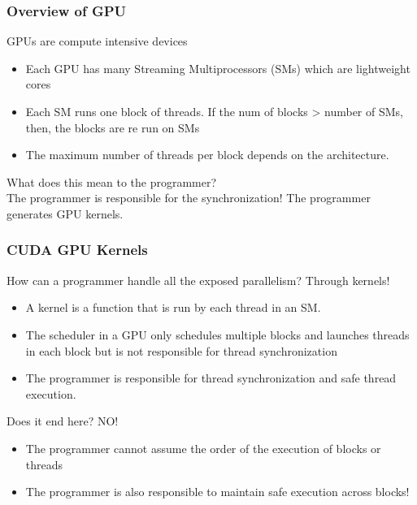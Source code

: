\documentclass[mathserif]{beamer}
\begin{document}
\begin{frame}                                                                                                                                                                          
\frametitle{Overview of GPU}
GPUs are compute intensive devices
\begin{itemize}
\item Each GPU has many Streaming Multiprocessors (SMs) which are lightweight cores  
\item Each SM runs one block of threads. If the num of blocks > number of SMs, then, the blocks are re run on SMs
\item The maximum number of threads per block depends on the architecture.  
\end{itemize}
What does this mean to the programmer? \\
The programmer is responsible for the synchronization!
The programmer generates GPU kernels. 
\end{frame}              

\begin{frame}                                                                                                                                                                          
\frametitle{CUDA GPU Kernels}
How can a programmer handle all the exposed parallelism? Through kernels!
\begin{itemize}
\item A kernel is a function that is run by each thread in an SM.  
\item The scheduler in a GPU only schedules multiple blocks and launches threads in each block but is not responsible for thread synchronization 
\item The programmer is responsible for thread synchronization and safe thread execution.  
\end{itemize}
Does it end here? NO!
\begin{itemize}
\item The programmer cannot assume the order of the execution of blocks or threads 
\item The programmer is also responsible to maintain safe execution across blocks! 
\end{itemize} 
\end{frame}              
\end{document}
